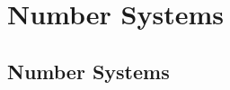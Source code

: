 \documentclass[20150903-160354-rs2.2-MarksMathNotebook.tex]{subfiles}
\begin{document}
%
%

\chapter{Number Systems}



\section{Number Systems}
\end{document}
